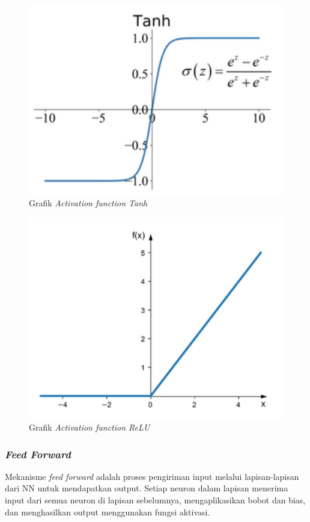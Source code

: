   \begin{figure}[H]
    \centering
    \includegraphics[scale=0.4]{gambar/bab2-grafik-tanh.png}
    \caption{Grafik \emph{Activation function Tanh}}
    \label{fig:tanh_function}
  \end{figure}

  \begin{figure}[H]
    \centering
    \includegraphics[scale=0.4]{gambar/bab2-grafik-relu.png}
    \caption{Grafik \emph{Activation function ReLU}}
    \label{fig:relu_function}
  \end{figure}
 
 \subsubsection{\emph{Feed Forward}}
 Mekanisme \emph{feed forward} adalah proses pengiriman input melalui lapisan-lapisan dari NN untuk mendapatkan output. Setiap neuron dalam lapisan menerima input dari semua neuron di lapisan sebelumnya, mengaplikasikan bobot dan bias, dan menghasilkan output menggunakan fungsi aktivasi.
 
